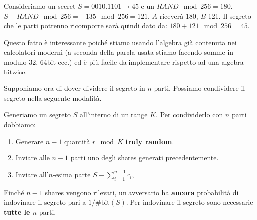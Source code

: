 \begin{example}
Consideriamo un secret $S=0010.1101\rightarrow 45$ e un $RAND\mod256=180$. $S-RAND\mod{256}=-135\mod{256}=121$. $A$ riceverà 180, $B$ 121. Il segreto che le parti potrenno ricomporre sarà quindi dato da: $180+121\mod{256}=45$.
\end{example}
\begin{note}
Questo fatto è interessante poiché stiamo usando l'algebra già contenuta nei calcolatori moderni (a seconda della parola usata stiamo facendo somme in modulo 32, 64bit ecc.) ed è più facile da implementare rispetto ad una algebra bitwise.
\end{note}
Supponiamo ora di dover dividere il segreto in $n$ parti. Possiamo condividere il segreto nella seguente modalità.
\begin{theorem}\label{thm:trivialsecret}
Generiamo un segreto $S$ all'interno di un range $K$. Per condividerlo con $n$ parti dobbiamo:
\begin{enumerate}
    \item Generare $n-1$ quantità $r\mod{K}$ \textbf{truly random}.
    \item Inviare alle $n-1$ parti uno degli shares generati precedentemente.
    \item Inviare all'$n$-esima parte $S-\sum_{i=1}^{n-1}{r_i}$,
\end{enumerate}
Finché $n-1$ shares vengono rilevati, un avversario ha \textbf{ancora} probabilità di indovinare il segreto pari a $1/\text{\#bit}(S)$. Per indovinare il segreto sono necessarie \textbf{tutte le $n$} parti.
\end{theorem}
